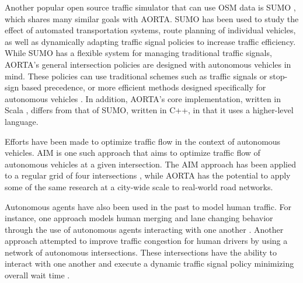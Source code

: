 \documentclass[letterpaper, 10 pt, conference]{ieeeconf}  %
\begin{document}
Another popular open source traffic simulator that can use OSM data is SUMO
\cite{SUMO2011}, which shares many similar goals with AORTA. SUMO has been used to
study the effect of automated transportation systems, route planning of
individual vehicles, as well as dynamically adapting traffic signal policies to
increase traffic efficiency. While SUMO has a flexible system for managing
traditional traffic signals, AORTA's general intersection policies are designed
with autonomous vehicles in mind. These policies can use traditional schemes
such as traffic signals or stop-sign based precedence, or more efficient methods
designed specifically for autonomous vehicles \cite{JAIR08-dresner}. In
addition, AORTA's core implementation, written in Scala \cite{scala}, differs
from that of SUMO, written in C++, in that it uses a higher-level language.

Efforts have been made to optimize traffic flow in the context of autonomous
vehicles. AIM \cite{JAIR08-dresner} is one such approach that aims to optimize
traffic flow of autonomous vehicles at a given intersection. The AIM approach
has been applied to a regular grid of four intersections
\cite{IROS11-hausknecht}, while AORTA has the potential to apply some of the
same research at a city-wide scale to real-world road networks.


Autonomous agents have also been used in the past to model human traffic. For
instance, one approach models human merging and lane changing behavior through
the use of autonomous agents interacting with one another
\cite{hidas2002modelling}. Another approach attempted to improve traffic
congestion for human drivers by using a network of autonomous intersections.
These intersections have the ability to interact with one another and execute a
dynamic traffic signal policy minimizing overall wait time
\cite{manikonda2001autonomous}.

\end{document}
